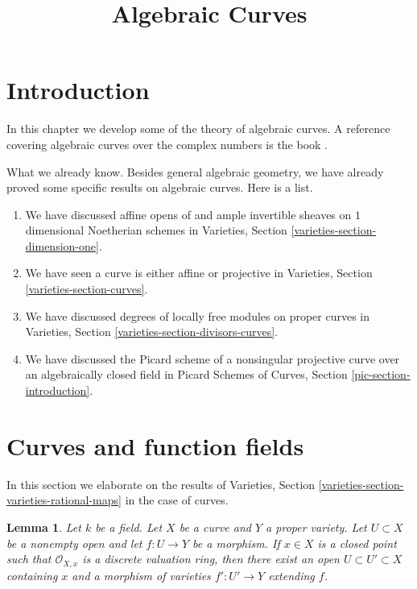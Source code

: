 \documentclass{stacks-project}
\theoremstyle{plain}
\newtheorem{lemma}[subsection]{Lemma}
\theoremstyle{definition}
\theoremstyle{remark}
\numberwithin{equation}{subsection}
\begin{document}
\title{Algebraic Curves}


\maketitle

\label{section-phantom}

\tableofcontents

\section{Introduction}
\label{section-introduction}

\noindent
In this chapter we develop some of the theory of algebraic curves.
A reference covering algebraic curves over the complex numbers is
the book \cite{ACGH}.

\medskip\noindent
What we already know. Besides general algebraic geometry, we
have already proved some specific results on algebraic curves.
Here is a list.
\begin{enumerate}
\item We have discussed affine opens of and ample invertible sheaves on
$1$ dimensional Noetherian schemes in
Varieties, Section \ref{varieties-section-dimension-one}.
\item We have seen a curve is either affine or projective
in Varieties, Section \ref{varieties-section-curves}.
\item We have discussed degrees of locally free modules on
proper curves in Varieties, Section \ref{varieties-section-divisors-curves}.
\item We have discussed the Picard scheme of a nonsingular projective
curve over an algebraically closed field in
Picard Schemes of Curves, Section \ref{pic-section-introduction}.
\end{enumerate}





\section{Curves and function fields}
\label{section-curves-function-fields}

\noindent
In this section we elaborate on the results of
Varieties, Section \ref{varieties-section-varieties-rational-maps}
in the case of curves.

\begin{lemma}
\label{lemma-extend-over-dvr}
Let $k$ be a field. Let $X$ be a curve and $Y$ a proper variety.
Let $U \subset X$ be a nonempty open and let $f : U \to Y$ be a morphism.
If $x \in X$ is a closed point such that $\mathcal{O}_{X, x}$
is a discrete valuation ring, then there exist an open
$U \subset U' \subset X$ containing $x$ and a morphism of
varieties $f' : U' \to Y$ extending $f$.
\end{lemma}
\end{document}
